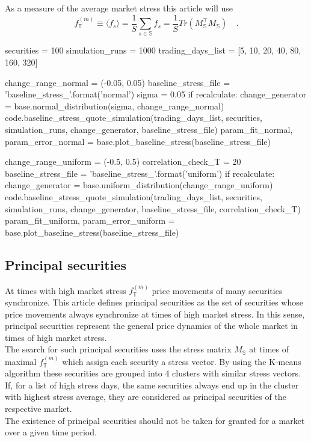 \documentclass[11pt,twoside,a4paper]{article}
\numberwithin{equation}{section}
\begin{document}
As a measure of the average market stress this article will use
\begin{equation}
f^{(m)}_\mathbb{T} \equiv \langle f_s\rangle=\frac{1}{S}\sum_{s\in\mathbb{S}}f_s=\frac{1}{S}Tr\left(M_\mathbb{S}^\top M_\mathbb{S}\right)\quad.
\end{equation}
\begin{pycode}
securities = 100
simulation_runs = 1000
trading_days_list = [5, 10, 20, 40, 80, 160, 320]

change_range_normal = (-0.05, 0.05)
baseline_stress_file = 'baseline_stress_{}'.format('normal')
sigma = 0.05
if recalculate:
	change_generator = base.normal_distribution(sigma, change_range_normal)
	code.baseline_stress_quote_simulation(trading_days_list, securities, simulation_runs, change_generator, baseline_stress_file)
param_fit_normal,  param_error_normal = base.plot_baseline_stress(baseline_stress_file)

change_range_uniform = (-0.5, 0.5)
correlation_check_T = 20
baseline_stress_file = 'baseline_stress_{}'.format('uniform')
if recalculate:
	change_generator = base.uniform_distribution(change_range_uniform)
	code.baseline_stress_quote_simulation(trading_days_list, securities, simulation_runs, change_generator, baseline_stress_file, correlation_check_T)
param_fit_uniform,  param_error_uniform = base.plot_baseline_stress(baseline_stress_file)
\end{pycode}
\FloatBarrier
\subsection{Principal securities}
At times with high market stress $f^{(m)}_\mathbb{T}$ price movements of many securities synchronize. This article defines principal securities as the set of securities whose price movements always synchronize at times of high market stress. In this sense, principal securities represent the general price dynamics of the whole market in times of high market stress.\\
The search for such principal securities uses the stress matrix $M_\mathbb{S}$ at times of maximal $f^{(m)}_\mathbb{T}$ which assign each security a stress vector. By using the K-means algorithm these securities are grouped into 4 clusters with similar stress vectors. If, for a list of high stress days, the same securities always end up in the cluster with highest stress average, they are considered as principal securities of the respective market.\\
The existence of principal securities should not be taken for granted for a market over a given time period.
\FloatBarrier
\pagebreak
\end{document}
